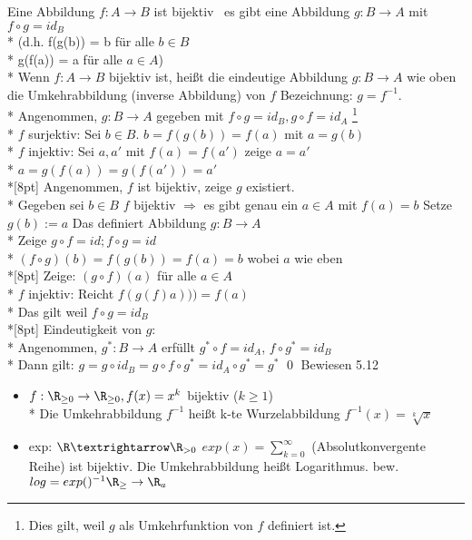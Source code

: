 Eine Abbildung $f: A \to B$ ist bijektiv \equ \ es gibt eine Abbildung $g: B \to A$ mit $f \circ g = id_B$\\*
(d.h. f(g(b)) = b für alle $b \in B$\\*
      g(f(a)) = a für alle $a \in A$)\\*
%
Wenn $f:A→B$ bijektiv ist, heißt die eindeutige Abbildung $g:B→A$ wie oben die Umkehrabbildung (inverse Abbildung) von $f$
Bezeichnung: $g=f^{-1}$.\\*
%
\bew
Angenommen, $g: B \to A$ gegeben mit $f \circ g = id_B, g \circ f = id_A$ \footnote{Dies gilt, weil $g$ als Umkehrfunktion von $f$ definiert ist.}\\*
$f$ surjektiv: Sei $b \in B$. $b = f(g(b)) = f(a)$ mit $a = g(b)$ \ok\\*
$f$ injektiv: Sei $a, a'$ mit $f(a) = f(a')$ zeige $a = a'$ \\*
$a = g(f(a)) = g(f(a')) = a' $\ok \\*[8pt]
%
Angenommen, $f$ ist bijektiv, zeige $g$ existiert.\\*
Gegeben sei $b \in B$ $f$ bijektiv $\Rightarrow$ es gibt genau ein $a \in A $ mit $f(a) = b$ 
Setze $g(b):=a$ Das definiert Abbildung $g:B→A$\\*
Zeige $g \circ f=id; f \circ g = id$\\*
$(f\circ g)(b)=f(g(b))=f(a)=b$ wobei $a$ wie eben\\*[8pt]
%
Zeige: $(g \circ f) (a) $ für alle $a \in A$\\*
$f$ injektiv: Reicht $f(g(f)a))) = f(a)$\\*
Das gilt weil $f \circ g = id_B$ \ok\\*[8pt]
Eindeutigkeit von $g$:\\*
Angenommen, $g^* : B \to A$ erfüllt $g^* \circ f = id_A$,
$f \circ g^* = id_B$ \\*
%
Dann gilt: $g=g\circ id_B=g\circ f\circ g^*=id_A\circ g^* = g^*$ \qed
\bsp
Bewiesen 5.12
\begin{itemize}
\item{$f: \R_{\geq 0} \to \R_{\geq 0}, f(x) = x^k$ bijektiv ($k \geq 1$)\\*
Die Umkehrabbildung $f^{-1}$ heißt k-te Wurzelabbildung $f^{-1}(x) = \sqrt[k]{x}$ }
%
\item{exp: $\R→\R_{>0}$ $exp(x) = \sum_{k=0}^{\infty}$ (Absolutkonvergente Reihe) ist bijektiv. Die Umkehrabbildung heißt Logarithmus. bew.
$log = exp()^{-1} \R_{\geq } \to \R_a$ }
\end{itemize}

